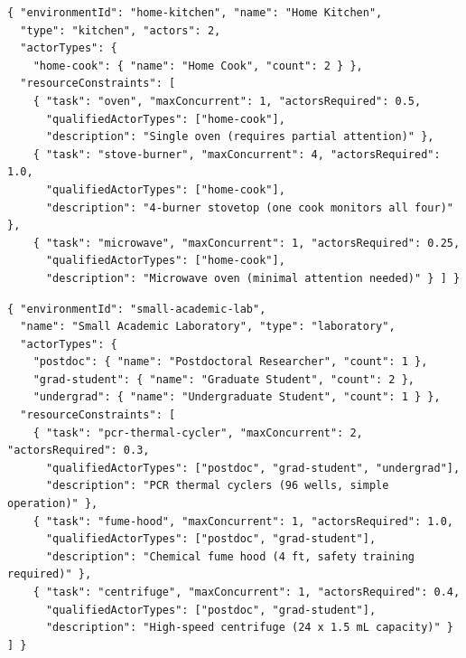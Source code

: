 \documentclass[10pt]{article}
\begin{document}
\begin{lstlisting}[caption={A home kitchen with two cooks, trimmed to three of its
sixteen resource constraints: the oven is capacity-one and takes half a cook's attention,
the four burners take a whole cook each, and the microwave a quarter.},label={lst:env-kitchen},float=tp]
{ "environmentId": "home-kitchen", "name": "Home Kitchen",
  "type": "kitchen", "actors": 2,
  "actorTypes": {
    "home-cook": { "name": "Home Cook", "count": 2 } },
  "resourceConstraints": [
    { "task": "oven", "maxConcurrent": 1, "actorsRequired": 0.5,
      "qualifiedActorTypes": ["home-cook"],
      "description": "Single oven (requires partial attention)" },
    { "task": "stove-burner", "maxConcurrent": 4, "actorsRequired": 1.0,
      "qualifiedActorTypes": ["home-cook"],
      "description": "4-burner stovetop (one cook monitors all four)" },
    { "task": "microwave", "maxConcurrent": 1, "actorsRequired": 0.25,
      "qualifiedActorTypes": ["home-cook"],
      "description": "Microwave oven (minimal attention needed)" } ] }
\end{lstlisting}

\begin{lstlisting}[caption={A small academic laboratory, trimmed to three of its
twenty-seven constraints and three of its seven actor types. Two thermal cyclers run
almost unattended; the fume hood (safety training required) and the centrifuge are
restricted to qualified actor types, which exclude the undergraduate.},label={lst:env-lab},float=tp]
{ "environmentId": "small-academic-lab",
  "name": "Small Academic Laboratory", "type": "laboratory",
  "actorTypes": {
    "postdoc": { "name": "Postdoctoral Researcher", "count": 1 },
    "grad-student": { "name": "Graduate Student", "count": 2 },
    "undergrad": { "name": "Undergraduate Student", "count": 1 } },
  "resourceConstraints": [
    { "task": "pcr-thermal-cycler", "maxConcurrent": 2, "actorsRequired": 0.3,
      "qualifiedActorTypes": ["postdoc", "grad-student", "undergrad"],
      "description": "PCR thermal cyclers (96 wells, simple operation)" },
    { "task": "fume-hood", "maxConcurrent": 1, "actorsRequired": 1.0,
      "qualifiedActorTypes": ["postdoc", "grad-student"],
      "description": "Chemical fume hood (4 ft, safety training required)" },
    { "task": "centrifuge", "maxConcurrent": 1, "actorsRequired": 0.4,
      "qualifiedActorTypes": ["postdoc", "grad-student"],
      "description": "High-speed centrifuge (24 x 1.5 mL capacity)" } ] }
\end{lstlisting}
\end{document}
